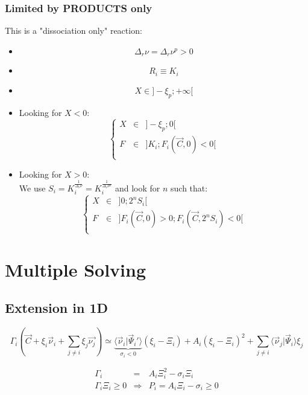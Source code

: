 \documentclass[aps,12pt]{revtex4}
\begin{document}
\subsubsection{Limited by PRODUCTS only}
This is a "dissociation only" reaction:
\begin{itemize}
\item
$$
	\Delta_r \nu =  \Delta_r \nu^p > 0 
$$
\item
$$
	R_i \equiv K_i
$$
\item
$$
	X \in \rbrack -\xi_p; +\infty \lbrack
$$
\item Looking for $X<0$:
$$
 \left\lbrace
 \begin{array}{rcl}
 	X &\in& \rbrack -\xi_p; 0 \lbrack\\
	F &\in& \rbrack K_i; F_i(\vec{C},0)<0 \lbrack\\
\end{array}
\right.
$$
\item Looking for $X>0$:\\
 We use $S_i=K_i^{\frac{1}{\Delta_r \nu}}=K_i^{\frac{1}{\Delta_r \nu^p}}$
 and look for $n$ such that:
 $$
 	\left\lbrace
 \begin{array}{rcl}
 	X &\in& \rbrack 0; 2^n S_i\lbrack\\
	F &\in& \rbrack F_i(\vec{C},0)>0; F_i(\vec{C},2^nS_i)<0 \lbrack\\
\end{array}
\right.
 $$



\end{itemize}
	
	
\section{Multiple Solving}

\subsection{Extension in 1D}

\begin{equation}
	\Gamma_i\left(\vec{C}+\xi_i \vec{\nu}_i + \sum_{j\not=i} \xi_j \vec{\nu_j}\right) 	\simeq 
	\underbrace{\langle \vec{\nu}_i \vert \vec{\Psi}_i' \rangle}_{\sigma_i<0} (\xi_i-\Xi_i) + A_i   (\xi_i-\Xi_i)^2
	+ \sum_{j\not=i} \langle \vec{\nu}_j \vert \vec{\Psi}_i \rangle \xi_j
\end{equation}

 \begin{equation}
 \begin{array}{rcl}
	\Gamma_i & = & A_i \Xi_i^2  -\sigma_i \Xi_i\\
	\Gamma_i \Xi_i \geq 0 & \Rightarrow &  P_i = A_i \Xi_i - \sigma_i \geq 0\\
\end{array}
 \end{equation}
\end{document}
